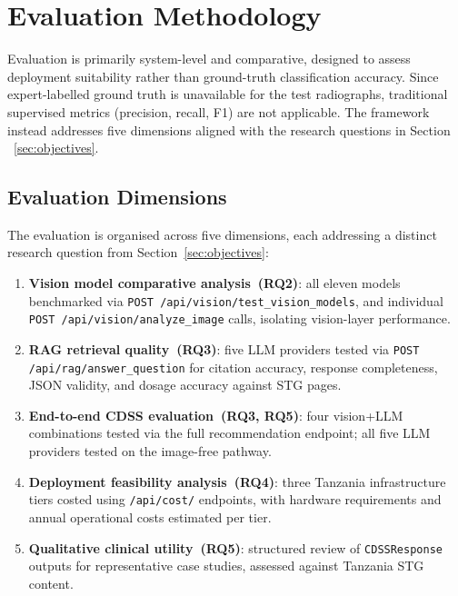 \documentclass[12pt,a4paper]{report}
\begin{document}
	\section{Evaluation Methodology}
	\label{sec:eval_method}
	
	Evaluation is primarily system-level and comparative, designed to assess deployment suitability rather than ground-truth classification accuracy. Since expert-labelled ground truth is unavailable for the test radiographs, traditional supervised metrics (precision, recall, F1) are not applicable. The framework instead addresses five dimensions aligned with the research questions in Section ~\ref{sec:objectives}.
	
	\subsection{Evaluation Dimensions}
	\label{subsec:dimensions}
	
	The evaluation is organised across five dimensions, each addressing a
	distinct research question from Section~\ref{sec:objectives}:
	
	\begin{enumerate}
		\item \textbf{Vision model comparative analysis~(RQ2)}: all eleven
		models benchmarked via \texttt{POST /api/vision/test\_vision\_models}, and individual \texttt{POST /api/vision/analyze\_image} calls,
		isolating vision-layer performance.
		\item \textbf{RAG retrieval quality~(RQ3)}: five LLM providers tested
		via \texttt{POST /api/rag/answer\_question} for citation accuracy,
		response completeness, JSON validity, and dosage accuracy against
		STG pages.
		\item \textbf{End-to-end CDSS evaluation~(RQ3, RQ5)}: four vision+LLM
		combinations tested via the full recommendation endpoint; all
		five LLM providers tested on the image-free pathway.
		\item \textbf{Deployment feasibility analysis~(RQ4)}: three Tanzania
		infrastructure tiers costed using \texttt{/api/cost/} endpoints,
		with hardware requirements and annual operational costs estimated
		per tier.
		\item \textbf{Qualitative clinical utility~(RQ5)}: structured review
		of \texttt{CDSSResponse} outputs for representative case studies,
		assessed against Tanzania STG content.
	\end{enumerate}
	
\end{document}
